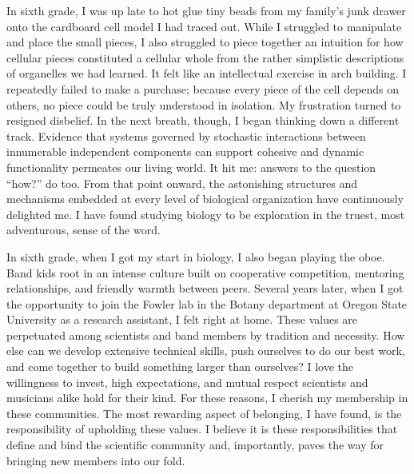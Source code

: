 
In sixth grade, I was up late to hot glue tiny beads from my family's junk drawer onto the cardboard cell model I had traced out.
While I struggled to manipulate and place the small pieces, I also struggled to piece together an intuition for how cellular pieces constituted a cellular whole from the rather simplistic descriptions of organelles we had learned.
It felt like an intellectual exercise in arch building.
I repeatedly failed to make a purchase;
because every piece of the cell depends on others, no piece could be truly understood in isolation.
My frustration turned to resigned disbelief.
In the next breath, though, I began thinking down a different track.
Evidence that systems governed by stochastic interactions between innumerable independent components can support cohesive and dynamic functionality permeates our living world.
It hit me: answers to the question ``how?'' do too.
From that point onward, the astonishing structures and mechanisms embedded at every level of biological organization have continuously delighted me.
I have found studying biology to be exploration in the truest, most adventurous, sense of the word.

In sixth grade, when I got my start in biology, I also began playing the oboe.
Band kids root in an intense culture built on cooperative competition, mentoring relationships, and friendly warmth between peers.
Several years later, when I got the opportunity to join the Fowler lab in the Botany department at Oregon State University as a research assistant, I felt right at home.
These values are perpetuated among scientists and band members by tradition and necessity.
How else can we develop extensive technical skills, push ourselves to do our best work, and come together to build something larger than ourselves?
I love the willingness to invest, high expectations, and mutual respect scientists and musicians alike hold for their kind.
For these reasons, I cherish my membership in these communities.
The most rewarding aspect of belonging, I have found, is the responsibility of upholding these values.
I believe it is these responsibilities that define and bind the scientific community and, importantly, paves the way for bringing new members into our fold.
